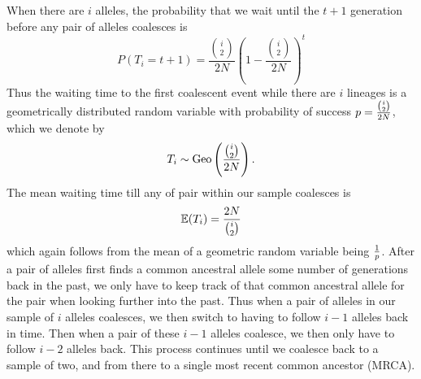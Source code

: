 When there are $i$ alleles, the probability that we wait until the
$t+1$ generation before
any pair of alleles coalesces is
\begin{equation}
P(T_i =t+1) = \frac{{i \choose
 2}}{2N}\left( 1- \frac{{i \choose
 2}}{2N}\right)^{t} \label{eqn:T_i}
\end{equation}
Thus the waiting time to the first coalescent event while there are $i$ lineages is a geometrically distributed random variable  with probability of success $p=\nicefrac{{i \choose 2}}{2N}$, which we denote by
\begin{equation}
T_i \sim \text{Geo}
\left(  \nicefrac{{i \choose
      2}}{2N} \right).
\end{equation}
The mean waiting time till any of pair within our
 sample coalesces is
\begin{equation}
\E( T_i) = \frac{2N}{{i \choose  2}}  \label{eqn:E_T_i}
\end{equation}
which again follows from the mean of a geometric random variable being $\nicefrac{1}{p}$.
After a pair of alleles first finds a common ancestral allele some
number of generations back in the past, we only have to keep
track of that common ancestral allele for the pair when looking further into the past. Thus when a pair
of alleles in our sample of $i$ alleles coalesces, we then switch to
having to follow $i-1$ alleles back in time. Then when a pair of these $i-1$
alleles coalesce, we then only have to follow $i-2$ alleles back. This
process continues until we coalesce back to a sample of two, and from
there to a single most recent common ancestor (MRCA).\\


